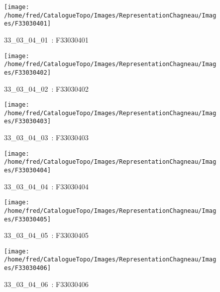 \documentclass[12pt,titlepage,oneside]{book}
\begin{document}
\begin{figure}[h!]
  \hfill         %
  \begin{minipage}[t]{3cm}
    \begin{center}
      \texttt{[image: /home/fred/CatalogueTopo/Images/RepresentationChagneau/Images/F33030401]}
      \caption[~33\_03\_04\_01]{\small{33\_03\_04\_01~:} \tiny{F33030401}}\label{F33030401}
    \end{center}
  \end{minipage}
  \begin{minipage}[t]{3cm}
    \begin{center}
      \texttt{[image: /home/fred/CatalogueTopo/Images/RepresentationChagneau/Images/F33030402]}
      \caption[~33\_03\_04\_02]{\small{33\_03\_04\_02~:} \tiny{F33030402}}\label{F33030402}
    \end{center}
  \end{minipage}
  \begin{minipage}[t]{3cm}
    \begin{center}
      \texttt{[image: /home/fred/CatalogueTopo/Images/RepresentationChagneau/Images/F33030403]}
      \caption[~33\_03\_04\_03]{\small{33\_03\_04\_03~:} \tiny{F33030403}}\label{F33030403}
    \end{center}
  \end{minipage}
  \begin{minipage}[t]{3cm}
    \begin{center}
      \texttt{[image: /home/fred/CatalogueTopo/Images/RepresentationChagneau/Images/F33030404]}
      \caption[~33\_03\_04\_04]{\small{33\_03\_04\_04~:} \tiny{F33030404}}\label{F33030404}
    \end{center}
  \end{minipage}
  \begin{minipage}[t]{3cm}
    \begin{center}
      \texttt{[image: /home/fred/CatalogueTopo/Images/RepresentationChagneau/Images/F33030405]}
      \caption[~33\_03\_04\_05]{\small{33\_03\_04\_05~:} \tiny{F33030405}}\label{F33030405}
    \end{center}
  \end{minipage}
  \begin{minipage}[t]{3cm}
    \begin{center}
      \texttt{[image: /home/fred/CatalogueTopo/Images/RepresentationChagneau/Images/F33030406]}
      \caption[~33\_03\_04\_06]{\small{33\_03\_04\_06~:} \tiny{F33030406}}\label{F33030406}
    \end{center}
  \end{minipage}
\end{figure}




\listoffigures
\end{document}
